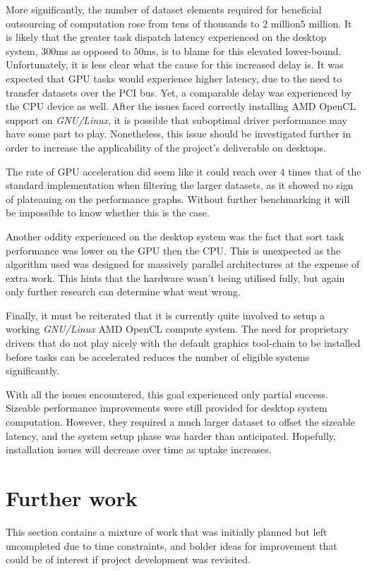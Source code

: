 More significantly, the number of dataset elements required for beneficial outsourcing of computation rose from tens of thousands to $2$ million\textendash$5$ million. It is likely that the greater task dispatch latency experienced on the desktop system, $300$ms as opposed to $50$ms, is to blame for this elevated lower-bound. Unfortunately, it is less clear what the cause for this increased delay is. It was expected that \ac{GPU} tasks would experience higher latency, due to the need to transfer datasets over the \ac{PCI} bus. Yet, a comparable delay was experienced by the \ac{CPU} device as well. After the issues faced correctly installing \ac{AMD} \ac{OpenCL} support on \emph{GNU/Linux}, it is possible that suboptimal driver performance may have some part to play. Nonetheless, this issue should be investigated further in order to increase the applicability of the project's deliverable on desktops.

The rate of \ac{GPU} acceleration did seem like it could reach over $4$ times that of the standard implementation when filtering the larger datasets, as it showed no sign of plateauing on the performance graphs. Without further benchmarking it will be impossible to know whether this is the case.

Another oddity experienced on the desktop system was the fact that sort task performance was lower on the \ac{GPU} then the \ac{CPU}. This is unexpected as the algorithm used was designed for massively parallel architectures at the expense of extra work. This hints that the hardware wasn't being utilised fully, but again only further research can determine what went wrong.

Finally, it must be reiterated that it is currently quite involved to setup a working \emph{GNU/Linux} \ac{AMD} \ac{OpenCL} compute system. The need for proprietary drivers that do not play nicely with the default graphics tool-chain to be installed before tasks can be accelerated reduces the number of eligible systems significantly.

With all the issues encountered, this goal experienced only partial success. Sizeable performance improvements were still provided for desktop system computation. However, they required a much larger dataset to offset the sizeable latency, and the system setup phase was harder than anticipated. Hopefully, installation issues will decrease over time as uptake increases.

\section{Further work}
This section contains a mixture of work that was initially planned but left uncompleted due to time constraints, and bolder ideas for improvement that could be of interest if project development was revisited.

